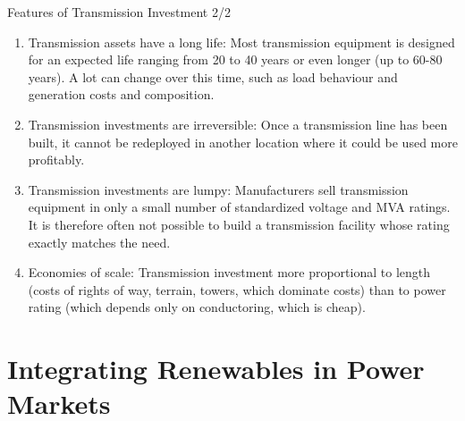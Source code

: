 \documentclass[10pt,aspectratio=169,dvipsnames]{beamer}
\let\olditem\item
\renewcommand{\item}{%
\olditem\vspace{5pt}}
\begin{document}
\begin{frame}{Features of Transmission Investment 2/2}


  \begin{enumerate}
  \item \alert{Transmission assets have a long life}: Most
    transmission equipment is designed for an expected life ranging
    from 20 to 40 years or even longer (up to 60-80 years). A lot can
    change over this time, such as load behaviour and generation costs
    and composition.
  \item \alert{Transmission investments are irreversible}: Once a transmission line has been built, it
  cannot be redeployed in another location where it could be used more profitably.
  \item \alert{Transmission investments are lumpy}: Manufacturers sell transmission equipment in
    only a small number of standardized voltage and MVA ratings. It is therefore often not
    possible to build a transmission facility whose rating exactly matches the need.
    \item \alert{Economies of scale}: Transmission investment more
      proportional to length (costs of rights of way, terrain, towers,
      which dominate costs) than to power rating (which depends only
      on conductoring, which is cheap).

  \end{enumerate}


\end{frame}



\section{Integrating Renewables in Power Markets}
\end{document}
